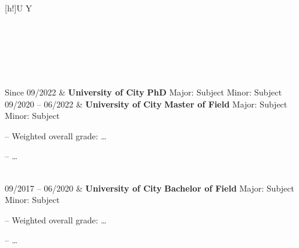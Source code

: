\begin{xltabular}{\textwidth}[h!]{U Y}

 \hrulefill \\ \\ 
\endfirsthead

 \hrulefill \\ \\
\endhead

Since %
09/2022 			&	\textbf{University of City} \newline
						\textbf{PhD} \newline
						Major: Subject \newline
						Minor: Subject \newline
						\\
					
09/2020 – %
06/2022 			&	\textbf{University of City} \newline
						\textbf{Master of Field} \newline
						Major: Subject \newline
						Minor: Subject
						\begin{compactitem}
							\item[–] Weighted overall grade: \dots
							\item[–] \dots
						\end{compactitem}
						\\
					
09/2017 – %
06/2020 			&	\textbf{University of City} \newline
						\textbf{Bachelor of Field} \newline
						Major: Subject \newline
						Minor: Subject
						\begin{compactitem}
							\item[–] Weighted overall grade: \dots
							\item[–] \dots
						\end{compactitem}
						\\

\end{xltabular}